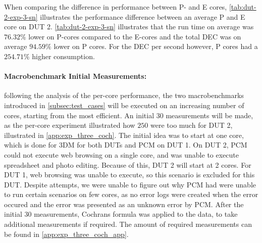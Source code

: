 When comparing the difference in performance between P- and E cores, \cref{tab:dut-2-exp-3-sn} illustrates the performance difference between an average P and E core on DUT 2. \cref{tab:dut-2-exp-3-sn} illustrates that the run time on average was $76.32\%$ lower on P-cores compared to the E-cores and the total DEC was on average $94.59\%$ lower on P cores. For the DEC per second however, P cores had a $254.71\%$ higher consumption. 








\paragraph*{Macrobenchmark Initial Measurements:} following the analysis of the per-core performance, the two macrobenchmarks introduced in \cref{subsec:test_cases} will be executed on an increasing number of cores, starting from the most efficient. An initial $30$ measurements will be made, as the per-core experiment illustrated how $250$ were too much for DUT 2, illustrated in \cref{app:exp_three_coch}. The initial idea was to start at one core, which is done for 3DM for both DUTs and PCM on DUT 1. On DUT 2, PCM could not execute web browsing on a single core, and was unable to execute spreadsheet and photo editing. Because of this, DUT 2 will start at 2 cores. For DUT 1, web browsing was unable to execute, so this scenario is excluded for this DUT. Despite attempts, we were unable to figure out why PCM had were unable to run certain scenarios on few cores, as no error logs were created when the error occured and the error was presented as an unknown error by PCM. After the initial $30$ measurements, Cochrans formula was applied to the data, to take additional measurements if required. The amount of required measurements can be found in \cref{app:exp_three_coch_app}.


